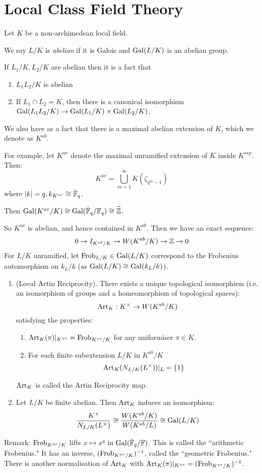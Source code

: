 \documentclass[10pt,a4paper]{article}
\begin{document}
\section{Local Class Field Theory}
Let $K$ be a non-archimedean local field.
\begin{definition}
  We say $L/K$ is \emph{abelian} if it is Galois and $\operatorname{Gal}(L/K)$ is an abelian group.
\end{definition}
If $L_1/K, L_2/K$ are abelian then it is a fact that
\begin{enumerate}
  \item $L_1L_2/K$ is abelian
  \item If $L_1 \cap L_2 = K$, then there is a canonical isomorphism $\operatorname{Gal}(L_1L_2/K) \to \operatorname{Gal}(L_1/K)\times\operatorname{Gal}(L_2/K)$.
\end{enumerate}
We also have as a fact that there is a maximal abelian extension of $K$, which we denote as $K^{ab}$.

For example, let $K^{ur}$ denote the maximal unramified extension of $K$ inside $K^{sep}$. Then:
\[K^{ur} = \bigcup_{m=1}^\infty K(\zeta_{q^m-1})\]
where $|k| = q, k_{K^{ur}} \cong \bar{\mathbb{F}}_q$.

Then $\operatorname{Gal}(K^{ur}/K) \cong \operatorname{Gal}(\bar{\mathbb{F}}_q/\mathbb{F}_q) \cong \widehat{\mathbb{Z}}$.

So $K^{ur}$ is abelian, and hence contained in $K^{ab}$. Then we have an exact sequence:
\[0 \to I_{K^{ab}/K} \to W(K^{ab}/K) \to \mathbb{Z} \to 0\]
For $L/K$ unramified, let $\operatorname{Frob}_{L/K} \in \operatorname{Gal}(L/K)$ correspond to the Frobenius automorphism on $k_L/k$ (as $\operatorname{Gal}(L/K) \cong \operatorname{Gal}(k_L/k)$).
\begin{theorem}\hspace*{0cm}
  \begin{enumerate}
    \item (Local Artin Reciprocity). There exists a unique topological isomorphism (i.e. an isomorphism of groups and a homeomorphism of topological spaces):
    \[\operatorname{Art}_K : K^\times \to W(K^{ab}/K)\]
    satisfying the properties:
    \begin{enumerate}
      \item $\operatorname{Art}_K(\pi)|_{K^{ur}} = \operatorname{Frob}_{K^{ur}/K}$ for any uniformiser $\pi \in K$.
      \item For each finite subextension $L/K$ in $K^{ab}/K$
      \[\operatorname{Art}_K(N_{L/K}(L^\times))|_L = \{1\}\]
    \end{enumerate}
    $\operatorname{Art}_K$ is called the Artin Reciprocity map.

    \item Let $L/K$ be finite abelian. Then $\operatorname{Art}_K$ induces an isomorphism:
    \[\frac{K^\times}{N_{L/K}(L^\times)} \cong \frac{W(K^{ab}/K)}{W(K^{ab}/L)} \cong \operatorname{Gal}(L/K)\]
  \end{enumerate}
\end{theorem}
Remark: $\operatorname{Frob}_{K^{ur}/K}$ lifts $x\mapsto x^q$ in $\operatorname{Gal}(\bar{\mathbb{F}}_q/\mathbb{F})$. This is called the ``arithmetic Frobenius." It has an inverse, $(\operatorname{Frob}_{K^{ur}/K})^{-1}$, called the ``geometric Frobenius." There is another normalisation of $\operatorname{Art}_K$ with $\operatorname{Art}_K(\pi)|_{K^{ur}} =(\operatorname{Frob}_{K^{ur}/K})^{-1}$.
\end{document}
